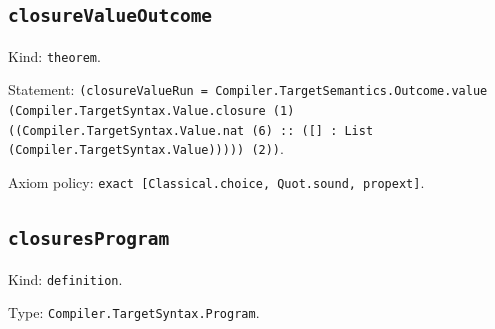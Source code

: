 \documentclass[11pt]{article}
\begin{document}
\subsection*{\texttt{closureValueOutcome}}
\noindent Kind: \texttt{theorem}.\par
\noindent Statement: \texttt{(closureValueRun = Compiler.TargetSemantics.Outcome.value (Compiler.TargetSyntax.Value.closure (1) ((Compiler.TargetSyntax.Value.nat (6) :: ([] : List (Compiler.TargetSyntax.Value))))) (2))}.\par
\noindent Axiom policy: \texttt{exact [Classical.choice, Quot.sound, propext]}.\par
\subsection*{\texttt{closuresProgram}}
\noindent Kind: \texttt{definition}.\par
\noindent Type: \texttt{Compiler.TargetSyntax.Program}.\par
\end{document}
